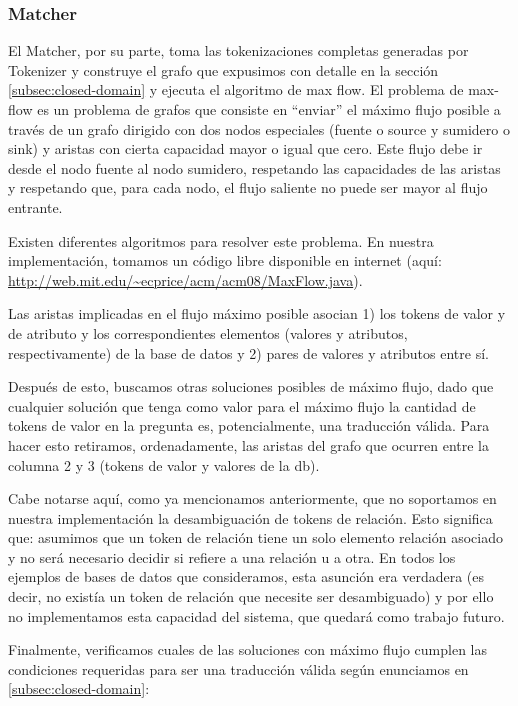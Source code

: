 \subsubsection*{Matcher}
\label{subsubsec:matcher}

El Matcher, por su parte, toma las tokenizaciones completas generadas por Tokenizer y construye el grafo que expusimos con detalle en la sección \ref{subsec:closed-domain} y ejecuta el algoritmo de max flow. El problema de max-flow es un problema de grafos que consiste en “enviar” el máximo flujo posible a través de un grafo dirigido con dos nodos especiales (fuente o source y sumidero o sink) y aristas con cierta capacidad mayor o igual que cero. Este flujo debe ir desde el nodo fuente al nodo sumidero, respetando las capacidades de las aristas y respetando que, para cada nodo, el flujo saliente no puede ser mayor al flujo entrante.

Existen diferentes algoritmos para resolver este problema. En nuestra implementación, tomamos un código libre disponible en internet (aquí: \url{http://web.mit.edu/~ecprice/acm/acm08/MaxFlow.java}).

Las aristas implicadas en el flujo máximo posible asocian 1) los tokens de valor y de atributo y los correspondientes elementos (valores y atributos, respectivamente) de la base de datos y 2) pares de valores y atributos entre sí.

Después de esto, buscamos otras soluciones posibles de máximo flujo, dado que cualquier solución que tenga como valor para el máximo flujo la cantidad de tokens de valor en la pregunta es, potencialmente, una traducción válida. Para hacer esto retiramos, ordenadamente, las aristas del grafo que ocurren entre la columna 2 y 3 (tokens de valor y valores de la db).

Cabe notarse aquí, como ya mencionamos anteriormente, que no soportamos en nuestra implementación la desambiguación de tokens de relación. Esto significa que: asumimos que un token de relación tiene un solo elemento relación asociado y no será necesario decidir si refiere a una relación u a otra. En todos los ejemplos de bases de datos que consideramos, esta asunción era verdadera (es decir, no existía un token de relación que necesite ser desambiguado) y por ello no implementamos esta capacidad del sistema, que quedará como trabajo futuro.

\medskip

Finalmente, verificamos cuales de las soluciones con máximo flujo cumplen las condiciones requeridas para ser una traducción válida según enunciamos en \ref{subsec:closed-domain}:

